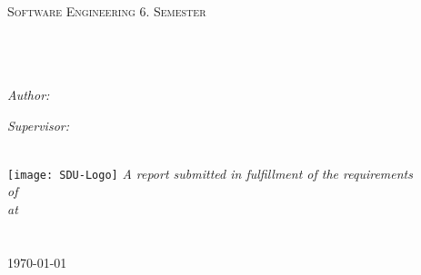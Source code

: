 \documentclass[
11pt, %
oneside, %
english, %
singlespacing, %
headsepline, %
]{MastersDoctoralThesis} %
\author{Lasse Bjørn \textsc{Hansen}\\
	Simon \textsc{Flensted}} %
\begin{document}
\frontmatter %

\pagestyle{plain} %


\begin{titlepage}
\begin{center}

\textsc{\LARGE \univname}\\[1.5cm] %
\textsc{\Large Software Engineering 6. Semester}\\[0.5cm] %

\HRule \\[0.4cm] %
{\huge \bfseries \ttitle}\\[0.4cm] %
\HRule \\[1.5cm] %
 
\begin{minipage}{0.4\textwidth}
\begin{flushleft} \large
\emph{Author:}\\
\authorname %
\end{flushleft}
\end{minipage}
\begin{minipage}{0.4\textwidth}
\begin{flushright} \large
\emph{Supervisor:} \\
{\supname} %
\end{flushright}
\end{minipage}\\[3cm]
\texttt{[image: SDU-Logo]} %
\large \textit{A report submitted in fulfillment of the requirements\\  of \degreename}\\[0.3cm] %
\textit{at}\\[0.4cm]
\univname\\\deptname\\[2cm] %
 
{\large \today}\\[4cm] %

 
\vfill
\end{center}
\end{titlepage}
\end{document}

